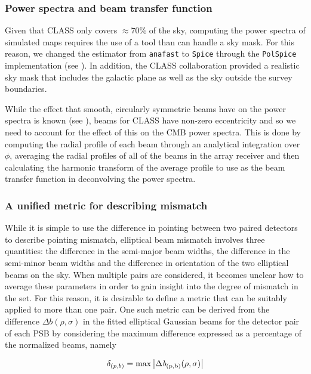 \documentclass[a4paper,11pt]{article}
\begin{document}
\subsubsection{Power spectra and beam transfer function}

Given that CLASS only covers $\approx 70\%$ of the sky, computing the power spectra of simulated maps requires the use of a tool than can handle a sky mask. For this reason, we changed the estimator from \texttt{anafast} to \texttt{Spice} through the \texttt{PolSpice} implementation (see \cite{2004MNRAS.350..914C}). In addition, the CLASS collaboration provided a realistic sky mask that includes the galactic plane as well as the sky outside the survey boundaries.

While the effect that smooth, circularly symmetric beams have on the power spectra is known (see \cite{2003ApJS..148...39P}), beams for CLASS have non-zero eccentricity and so we need to account for the effect of this on the CMB power spectra. This is done by computing the radial profile of each beam through an analytical integration over $\phi$, averaging the radial profiles of all of the beams in the array receiver and then calculating the harmonic transform of the average profile to use as the beam transfer function in deconvolving the power spectra.

\subsubsection{A unified metric for describing mismatch }
\label{sec::mismatch_metric}

While it is simple to use the difference in pointing between two paired detectors to describe pointing mismatch, elliptical beam mismatch involves three quantities: the difference in the semi-major beam widths, the difference in the semi-minor beam widths and the difference in orientation of the two elliptical beams on the sky. When multiple pairs are considered, it becomes unclear how to average these parameters in order to gain insight into the degree of mismatch in the set. For this reason, it is desirable to define a metric that can be suitably applied to more than one pair. One such metric can be derived from the difference $\Delta \mathit{b}(\rho,\sigma)$ in the fitted elliptical Gaussian beams for the detector pair of each PSB by considering the maximum difference expressed as a percentage of the normalized beams, namely

\begin{equation}
\delta_{(p,b)} = \rm{max}\left| \Delta \mathit{b}_{(p,b)}(\rho,\sigma) \right|
\end{equation}
\end{document}
